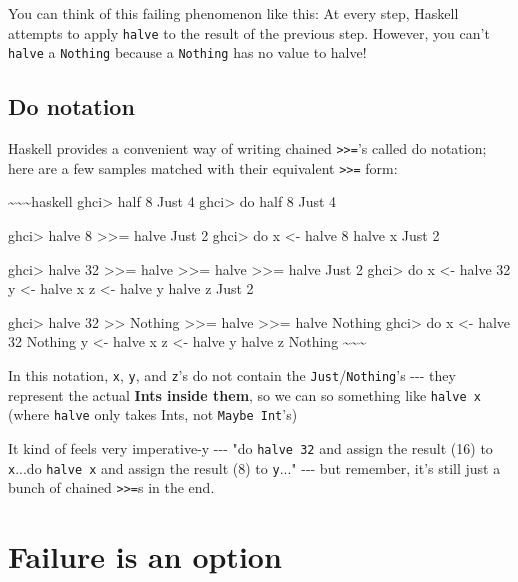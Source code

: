 \documentclass[]{article}
\begin{document}
You can think of this failing phenomenon like this: At every step, Haskell
attempts to apply \texttt{halve} to the result of the previous step. However,
you can't \texttt{halve} a \texttt{Nothing} because a \texttt{Nothing} has no
value to halve!

\subsection{Do notation}

Haskell provides a convenient way of writing chained
\texttt{\textgreater{}\textgreater{}=}'s called do notation; here are a few
samples matched with their equivalent \texttt{\textgreater{}\textgreater{}=}
form:

\textasciitilde{}\textasciitilde{}\textasciitilde{}haskell ghci\textgreater{}
half 8 Just 4 ghci\textgreater{} do half 8 Just 4

ghci\textgreater{} halve 8 \textgreater{}\textgreater{}= halve Just 2
ghci\textgreater{} do x \textless{}- halve 8 \textbar{} halve x Just 2

ghci\textgreater{} halve 32 \textgreater{}\textgreater{}= halve
\textgreater{}\textgreater{}= halve \textgreater{}\textgreater{}= halve Just 2
ghci\textgreater{} do x \textless{}- halve 32 \textbar{} y \textless{}- halve x
\textbar{} z \textless{}- halve y \textbar{} halve z Just 2

ghci\textgreater{} halve 32 \textgreater{}\textgreater{} Nothing
\textgreater{}\textgreater{}= halve \textgreater{}\textgreater{}= halve Nothing
ghci\textgreater{} do x \textless{}- halve 32 \textbar{} Nothing \textbar{} y
\textless{}- halve x \textbar{} z \textless{}- halve y \textbar{} halve z
Nothing \textasciitilde{}\textasciitilde{}\textasciitilde{}

In this notation, \texttt{x}, \texttt{y}, and \texttt{z}'s do not contain the
\texttt{Just}/\texttt{Nothing}'s -\/-\/- they represent the actual \textbf{Ints
inside them}, so we can so something like \texttt{halve\ x} (where
\texttt{halve} only takes Ints, not \texttt{Maybe\ Int}'s)

It kind of feels very imperative-y -\/-\/- "do \texttt{halve\ 32} and assign the
result (16) to \texttt{x}...do \texttt{halve\ x} and assign the result (8) to
\texttt{y}..." -\/-\/- but remember, it's still just a bunch of chained
\texttt{\textgreater{}\textgreater{}=}s in the end.

\section{Failure is an option}
\end{document}

